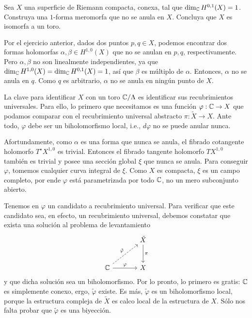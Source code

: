 \begin{exercise}
Sea $X$ una superficie de Riemann compacta, conexa, tal que $\dim_\mathbb C H^{0,1}(X) = 1$. Construya una $1$-forma meromorfa que no se anula en $X$. Concluya que $X$ es isomorfa a un toro.
\end{exercise}

\begin{solution}
Por el ejercicio anterior, dados dos puntos $p, q \in X$, podemos encontrar dos formas holomorfas $\alpha, \beta \in H^{1,0}(X)$ que no se anulan en $p, q$, respectivamente. Pero $\alpha, \beta$ no son linealmente independientes, ya que $\dim_\mathbb C H^{1,0}(X) = \dim_\mathbb C H^{0,1}(X) = 1$, así que $\beta$ es múltiplo de $\alpha$. Entonces, $\alpha$ no se anula en $q$. Como $q$ es arbitrario, $\alpha$ no se anula en ningún punto de $X$.

La clave para identificar $X$ con un toro $\mathbb C / \Lambda$ es identificar sus recubrimientos universales. Para ello, lo primero que necesitamos es una función $\varphi : \mathbb C \to X$ que podamos comparar con el recubrimiento universal abstracto $\pi : \tilde X \to X$. Ante todo, $\varphi$ debe ser un biholomorfismo local, i.e., $d\varphi$ no se puede anular nunca.

Afortundamente, como $\alpha$ es una forma que nunca se anula, el fibrado cotangente holomorfo $T^\star X^{1,0}$ es trivial. Entonces el fibrado tangente holomorfo $TX^{1,0}$ también es trivial y posee una sección global $\xi$ que nunca se anula. Para conseguir $\varphi$, tomemos cualquier curva integral de $\xi$. Como $X$ es compacta, $\xi$ es un campo completo, por ende $\varphi$ está parametrizada por todo $\mathbb C$, no un mero subconjunto abierto.

Tenemos en $\varphi$ un candidato a recubrimiento universal. Para verificar que este candidato sea, en efecto, un recubrimiento universal, debemos constatar que exista una solución al problema de levantamiento
$$
\begin{tikzcd}[row sep=large, column sep=large]
& \tilde X \arrow[d, "\pi"] \\
\C \arrow[ru, dashed, "\tilde \varphi"] \arrow[r, "\varphi"] & X
\end{tikzcd}
$$
y que dicha solución sea un biholomorfismo. Por lo pronto, lo primero es gratis: $\mathbb C$ es simplemente conexo, ergo, $\tilde \varphi$ existe. Es más, $\tilde \varphi$ es un biholomorfismo local, porque la estructura compleja de $\tilde X$ es calco local de la estructura de $X$. Sólo nos falta probar que $\tilde \varphi$ es una biyección.


\end{solution}
